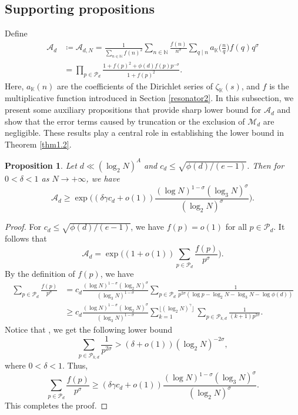 \documentclass[12pt,reqno]{amsart}
\newtheorem{prop}{Proposition}[section]
\theoremstyle{definition}
\numberwithin{equation}{section}
\newcommand{\mbk}{\mathbb{K}}
\newcommand{\mbn}{\mathbb{N}}
\newcommand{\mca}{\mathcal{A}}
\newcommand{\mcp}{\mathcal{P}}
\newcommand{\mcm}{\mathcal{M}}
\begin{document}
\subsection{Supporting propositions}
\label{supportingpropositions}
Define
\begin{align*}
    \mca_d &\coloneqq \mca_{d,N}= \frac{1}{\sum_{n\in \mbn} f(n)^2} \sum_{n\in\mbn} \frac{f(n)}{n^{\sigma}} \sum_{q\mid n} a_\mbk\Big(\frac{n}{q}\Big)f(q)q^{\sigma} \\
    & = \prod_{p\in \mcp_d} \frac{1 + f(p)^2 + \phi(d)f(p)p^{-\sigma}}{1 + f(p)^2}.
\end{align*}
Here, $a_\mbk(n)$ are the coefficients of the Dirichlet series of $\zeta_\mbk(s)$, and $f$ is the multiplicative function introduced in Section \ref{resonator2}. In this subsection, we present 
some auxiliary propositions that provide sharp lower bound for $\mca_d$ and show that the error terms caused by truncation or the exclusion of $\mcm_d$ are negligible. These results play a central role in establishing the lower bound in Theorem \ref{thm1.2}.
\begin{prop}
    \label{prop41}
    Let $d \ll (\log_2 N)^A$ and $c_d \le \sqrt{\phi(d)/(e-1)}$. Then for $0 < \delta <1$ as $N \to +\infty$, we have
    $$\mca_d \geq \exp\bigg((\delta\gamma c_d+ o(1))\frac{(\log N)^{1-\sigma}(\log_3 N)^{\sigma}}{(\log_2 N)^{\sigma}}\bigg).$$
\end{prop}
\begin{proof}
    For $c_d \le \sqrt{\phi(d)/(e-1)}$, we have $f(p)=o(1)$ for all $p \in \mcp_d$. It follows that
    $$
    \mca_d = \exp \Big((1+o(1)) \sum_{p \in \mcp_d} \frac{f(p)}{p^{\sigma}}\Big).
    $$
    By the definition of $f(p)$, we have
      \begin{align*}
      \sum_{p \in \mcp_d} \frac{f(p)}{p^{\sigma}} 
      & =c_d \frac{(\log N)^{1 - \sigma} (\log_2  N)^{\sigma}}{(\log_3 N)^{1 - \sigma}} \sum_{p \in \mcp_d} \frac{1}{p^{2\sigma}(\log p-\log _2 N-\log _3 N - \log \phi(d))}  \\
      & \ge c_d \frac{(\log N)^{1 - \sigma} (\log_2 N)^{\sigma}}{(\log_3 N)^{1 - \sigma}} \sum_{k=1}^{\lfloor(\log_2 N)^{\gamma}\rfloor} \sum_{p \in \mcp_{k,d}} \frac{1}{(k+1)p^{2\sigma}}.
      \end{align*}
      Notice that \cite[Lemma 9]{chirre2019extreme}, we get the following lower bound
    $$
    \sum_{p \in \mcp_{k,d}} \frac{1}{p^{2\sigma}} > (\delta + o(1))(\log_2 N)^{ -2\sigma},
    $$
    where $0< \delta <1$. Thus,
    $$
    \sum_{p \in \mcp_d} \frac{f(p)}{p^{\sigma}} \ge (\delta\gamma c_d + o(1))\frac{(\log N)^{1-\sigma} (\log_3 N)^{\sigma}}{(\log_2 N)^{\sigma}}.
    $$
    This completes the proof.
\end{proof}
\end{document}
